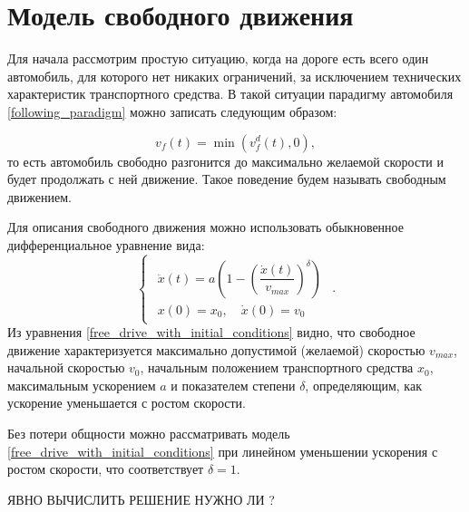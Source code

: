 \documentclass[12pt, a4paper]{extarticle}
\numberwithin{equation}{section}
\begin{document}
\section{Модель свободного движения}

Для начала рассмотрим простую ситуацию, когда на дороге есть всего один автомобиль, для которого нет никаких ограничений, за исключением технических характеристик транспортного средства. В такой ситуации парадигму автомобиля \eqref{following_paradigm} можно записать следующим образом:

\begin{equation} \label{following_paradigm_alone}
v_f(t) = \min(v_f^d(t), 0),
\end{equation}
то есть автомобиль свободно разгонится до максимально желаемой скорости и будет продолжать с ней движение. Такое поведение будем называть свободным движением. 

Для описания свободного движения можно использовать обыкновенное дифференциальное уравнение вида: 
\begin{equation} \label{free_drive_with_initial_conditions}
\begin{cases}
\begin{split}
\ddot{x}(t) = a\left( 1-\left( \dfrac{\dot{x}(t)}{v_{max}}\right)^\delta \right) \\
x(0)=x_0, \quad \dot{x}(0)=v_{0}
\end{split}
\end{cases}.
\end{equation}
Из уравнения \eqref{free_drive_with_initial_conditions} видно, что свободное движение характеризуется максимально допустимой (желаемой) скоростью $v_{max}$, начальной скоростью $v_{0}$, начальным положением транспортного средства $x_0$, максимальным ускорением $a$ и показателем степени $\delta$, определяющим, как ускорение уменьшается с ростом скорости.

Без потери общности можно рассматривать модель \eqref{free_drive_with_initial_conditions} при линейном уменьшении ускорения с ростом скорости, что соответствует $\delta=1$.

ЯВНО ВЫЧИСЛИТЬ РЕШЕНИЕ НУЖНО ЛИ ?
\end{document}

